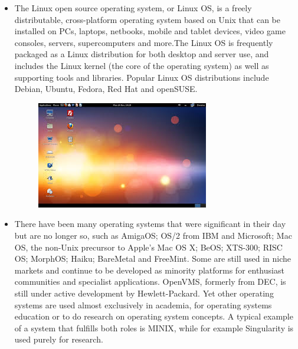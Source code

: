 \documentclass[11pt,a4paper]{article}
\begin{document}
\begin{itemize}
\begin{figure}[h!]
				\centering
			\end{figure}
		\newpage 
		\item The Linux open source operating system, or Linux OS, is a freely distributable, cross-platform operating system based on Unix that can be installed on PCs, laptops, netbooks, mobile and tablet devices, video game consoles, servers, supercomputers and more.The Linux OS is frequently packaged as a Linux distribution for both desktop and server use, and includes the Linux kernel (the core of the operating system) as well as supporting tools and libraries. Popular Linux OS distributions include Debian, Ubuntu, Fedora, Red Hat and openSUSE.
		\begin{figure}[h!]
			\includegraphics{linux.jpg}
			\centering
		\end{figure} 
		\item There have been many operating systems that were significant in their day but are no longer so, such as AmigaOS; OS/2 from IBM and Microsoft; Mac OS, the non-Unix precursor to Apple's Mac OS X; BeOS; XTS-300; RISC OS; MorphOS; Haiku; BareMetal and FreeMint. Some are still used in niche markets and continue to be developed as minority platforms for enthusiast communities and specialist applications. OpenVMS, formerly from DEC, is still under active development by Hewlett-Packard. Yet other operating systems are used almost exclusively in academia, for operating systems education or to do research on operating system concepts. A typical example of a system that fulfills both roles is MINIX, while for example Singularity is used purely for research.
	\end{itemize}
	
	\newpage
\end{document}
